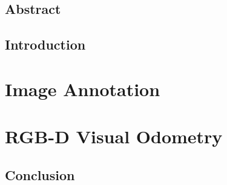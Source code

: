 \frontmatter

\makeflyleaf%

\pagestyle{fancy}
\fancyhf{}
\fancyhead[LE]{\leftmark}
\fancyhead[RO]{\rightmark}
\fancyhead[LO]{\today}
\fancyfoot[CE,CO]{\thepage}

% 

\chapter*{Abstract}
\small
\vspace{-1em}

\normalsize

\dominitoc%
\tableofcontents

\mainmatter%

\lstset{style=CodeStyle}

\chapter*{Introduction}%
\label{cha:introduction}


\part{Image Annotation}%
\label{prt:image_annotation}


\part{RGB-D Visual Odometry}%
\label{prt:rgb_d_vo}


\chapter*{Conclusion}%
\label{cha:conclusion}


